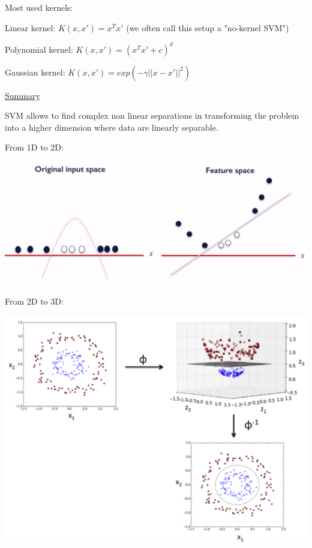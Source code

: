 \vspace{5mm}

Most used kernels:

Linear kernel: $K(x,x') = x^Tx'$ (we often call this setup a "no-kernel SVM")

Polynomial kernel: $K(x,x') = (x^Tx'+c)^d$

Gaussian kernel: $K(x,x') = exp(-\gamma||x-x'||^2)$

\vspace{5mm}

\underline{Summary}

\vspace{5mm}

SVM allows to find complex non linear separations in transforming the problem into a higher dimension where data are linearly separable.

\vspace{5mm}

From 1D to 2D:

\begin{center}
\includegraphics[scale=0.15]{kernel_2D.png}
\end{center}

\vspace{5mm}

From 2D to 3D:

\begin{center}
\includegraphics[scale=0.5]{kernel_3D.png}
\end{center}

\vspace{5mm}